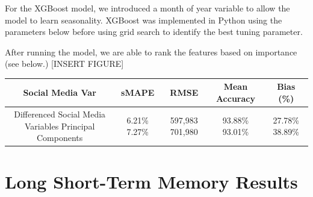 \documentclass[12pt,oneside]{chicagocapstone}
\begin{document}
For the XGBoost model, we introduced a month of year variable to allow
the model to learn seasonality. XGBoost was implemented in Python using
the parameters below before using grid search to identify the best
tuning parameter.

After running the model, we are able to rank the features based on
importance (see below.) {[}INSERT FIGURE{]}
\begin{longtable}[]{@{}ccccc@{}}
\toprule
\begin{minipage}[b]{0.27\columnwidth}\centering\strut
Social Media Var\strut
\end{minipage} & \begin{minipage}[b]{0.13\columnwidth}\centering\strut
sMAPE\strut
\end{minipage} & \begin{minipage}[b]{0.14\columnwidth}\centering\strut
RMSE\strut
\end{minipage} & \begin{minipage}[b]{0.16\columnwidth}\centering\strut
Mean Accuracy\strut
\end{minipage} & \begin{minipage}[b]{0.16\columnwidth}\centering\strut
Bias (\%)\strut
\end{minipage}\tabularnewline
\midrule
\endhead
\begin{minipage}[t]{0.27\columnwidth}\centering\strut
Differenced Social Media Variables Principal Components\strut
\end{minipage} & \begin{minipage}[t]{0.13\columnwidth}\centering\strut
6.21\% 7.27\%\strut
\end{minipage} & \begin{minipage}[t]{0.14\columnwidth}\centering\strut
597,983 701,980\strut
\end{minipage} & \begin{minipage}[t]{0.16\columnwidth}\centering\strut
93.88\% 93.01\%\strut
\end{minipage} & \begin{minipage}[t]{0.16\columnwidth}\centering\strut
27.78\% 38.89\%\strut
\end{minipage}\tabularnewline
\bottomrule
\end{longtable}
\section*{Long Short-Term Memory
Results}\label{long-short-term-memory-results}
\end{document}
